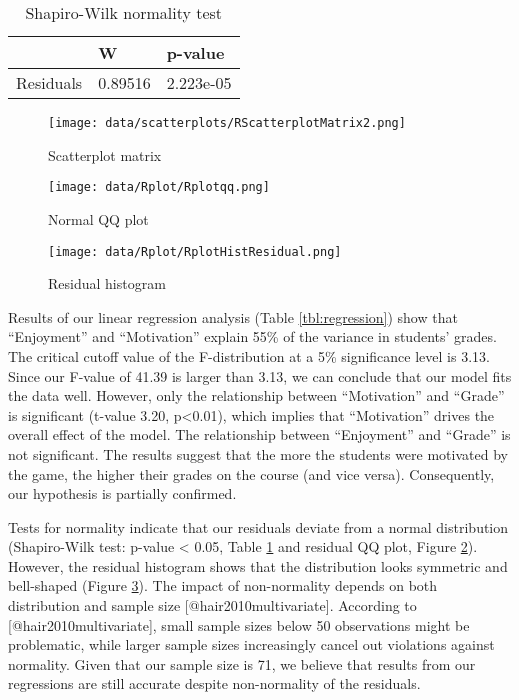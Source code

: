 \documentclass[
]{article}
\begin{document}
\begin{table}[t]
\begin{tabular}{|r|l|l|}
\hline
 & W & p-value \\
 \hline
 Residuals & 0.89516 & 2.223e-05 \\
 \hline
\end{tabular}
\caption{\label{tbl:shapiro}Shapiro-Wilk normality test}
\end{table}

\begin{figure}[t]
\texttt{[image: data/scatterplots/RScatterplotMatrix2.png]}
\caption{\label{fig:matrix}Scatterplot matrix}
\end{figure}

\begin{figure}
\texttt{[image: data/Rplot/Rplotqq.png]}
\caption{\label{fig:qq} Normal QQ plot}
\end{figure}

\begin{figure}
\texttt{[image: data/Rplot/RplotHistResidual.png]}
\caption{\label{fig:res-hist} Residual histogram}
\end{figure}

Results of our linear regression analysis (Table \ref{tbl:regression})
show that ``Enjoyment'' and ``Motivation'' explain 55\% of the variance
in students' grades. The critical cutoff value of the F-distribution at
a 5\% significance level is 3.13. Since our F-value of 41.39 is larger
than 3.13, we can conclude that our model fits the data well. However,
only the relationship between ``Motivation'' and ``Grade'' is
significant (t-value 3.20, p\textless0.01), which implies that
``Motivation'' drives the overall effect of the model. The relationship
between ``Enjoyment'' and ``Grade'' is not significant. The results
suggest that the more the students were motivated by the game, the
higher their grades on the course (and vice versa). Consequently, our
hypothesis is partially confirmed.

Tests for normality indicate that our residuals deviate from a normal
distribution (Shapiro-Wilk test: p-value \textless{} 0.05, Table
\ref{tbl:shapiro} and residual QQ plot, Figure \ref{fig:qq}). However,
the residual histogram shows that the distribution looks symmetric and
bell-shaped (Figure \ref{fig:res-hist}). The impact of non-normality
depends on both distribution and sample size
{[}@hair2010multivariate{]}. According to {[}@hair2010multivariate{]},
small sample sizes below 50 observations might be problematic, while
larger sample sizes increasingly cancel out violations against
normality. Given that our sample size is 71, we believe that results
from our regressions are still accurate despite non-normality of the
residuals.
\end{document}
